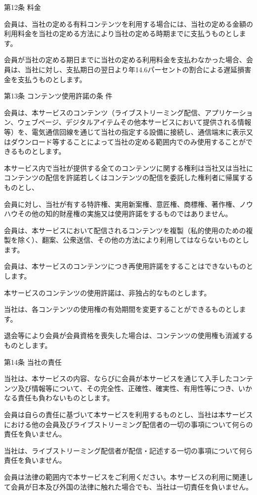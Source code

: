 第12条 料金

    会員は、当社の定める有料コンテンツを利用する場合には、当社の定める金額の利用料金を当社の定める方法により当社の定める時期までに支払うものとします。

    会員が当社の定める期日までに当社の定める利用料金を支払わなかった場合、会員は、当社に対し、支払期日の翌日より年14.6パーセントの割合による遅延損害金を支払うものとします。

第13条 コンテンツ使用許諾の条 件

    会員は、本サービスのコンテンツ（ライブストリーミング配信、アプリケーション、ウェブページ、デジタルアイテムその他本サービスにおいて提供される情報等）を、電気通信回線を通じて当社の指定する設備に接続し、通信端末に表示又はダウンロード等することによって当社の定める範囲内でのみ使用することができるものとします。

    本サービス内で当社が提供する全てのコンテンツに関する権利は当社又は当社にコンテンツの配信を許諾若しくはコンテンツの配信を委託した権利者に帰属するものとし、

    会員に対し、当社が有する特許権、実用新案権、意匠権、商標権、著作権、ノウハウその他の知的財産権の実施又は使用許諾をするものではありません。

    会員は、本サービスにおいて配信されるコンテンツを複製（私的使用のための複製を除く）、翻案、公衆送信、その他の方法により利用してはならないものとします。

    会員は、本サービスのコンテンツにつき再使用許諾をすることはできないものとします。

    本サービスのコンテンツの使用許諾は、非独占的なものとします。

    当社は、各コンテンツの使用権の有効期間を変更することができるものとします。

    退会等により会員が会員資格を喪失した場合は、コンテンツの使用権も消滅するものとします。

第14条 当社の責任

    当社は、本サービスの内容、ならびに会員が本サービスを通じて入手したコンテンツ及び情報等について、その完全性、正確性、確実性、有用性等につき、いかなる責任も負わないものとします。

    会員は自らの責任に基づいて本サービスを利用するものとし、当社は本サービスにおける他の会員及びライブストリーミング配信者の一切の事項について何らの責任を負いません。

    当社は、ライブストリーミング配信者が配信・記述する一切の事項について何ら責任を負いません。

    会員は法律の範囲内で本サービスをご利用ください。本サービスの利用に関連して会員が日本及び外国の法律に触れた場合でも、当社は一切責任を負いません。

